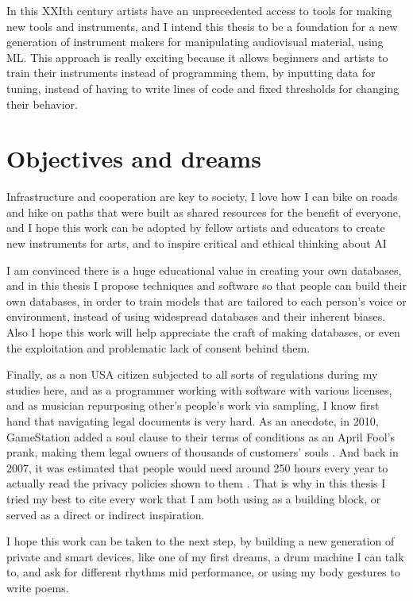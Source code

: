 In this XXIth century artists have an unprecedented access to tools for making new tools and instruments, and I intend this thesis to be a foundation for a new generation of instrument makers for manipulating audiovisual material, using \acrshort{ML}. This approach is really exciting because it allows beginners and artists to train their instruments instead of programming them, by inputting data for tuning, instead of having to write lines of code and fixed thresholds for changing their behavior.

\section{Objectives and dreams}

Infrastructure and cooperation are key to society, I love how I can bike on roads and hike on paths that were built as shared resources for the benefit of everyone, and I hope this work can be adopted by fellow artists and educators to create new instruments for arts, and to inspire critical and ethical thinking about \acrshort{AI}

I am convinced there is a huge educational value in creating your own databases, and in this thesis I propose techniques and software so that people can build their own databases, in order to train models that are tailored to each person's voice or environment, instead of using widespread databases and their inherent biases. Also I hope this work will help appreciate the craft of making databases, or even the exploitation and problematic lack of consent behind them.

Finally, as a non USA citizen subjected to all sorts of regulations during my studies here, and as a programmer working with software with various licenses, and as musician repurposing other's people's work via sampling, I know first hand that navigating legal documents is very hard. As an anecdote, in 2010, GameStation added a soul clause to their terms of conditions as an April Fool's prank, making them legal owners of thousands of customers' souls \cite{website-huffpost-gamestation-soul-clause}. And back in 2007, it was estimated that people would need around 250 hours every year to actually read the privacy policies shown to them \cite{article-cost-of-reading-privacy-policies}. That is why in this thesis I tried my best to cite every work that I am both using as a building block, or served as a direct or indirect inspiration.

I hope this work can be taken to the next step, by building a new generation of private and smart devices, like one of my first dreams, a drum machine I can talk to, and ask for different rhythms mid performance, or using my body gestures to write poems.


